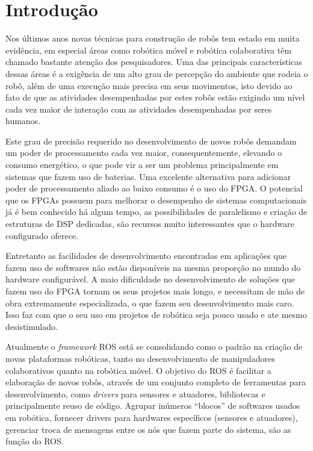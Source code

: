 \chapter{Introdução}\label{cap:intro}


Nos últimos anos novas técnicas para construção de robôs tem estado em muita evidência, em especial áreas como robótica móvel e robótica colaborativa têm chamado bastante atenção dos pesquisadores. Uma das principais características dessas áreas é a exigência de um alto grau de percepção do ambiente que rodeia o robô, além de uma execução mais precisa em seus movimentos, isto devido ao fato de que as atividades desempenhadas por estes robôs estão exigindo um nível cada vez maior de interação com as atividades desempenhadas por seres humanos.

Este grau de precisão requerido no desenvolvimento de novos robôs demandam um poder de processamento cada vez maior, consequentemente, elevando o consumo energético, o que pode vir a ser um problema principalmente em sistemas que fazem uso de baterias. Uma excelente alternativa para adicionar poder de processamento aliado ao baixo consumo é o uso do FPGA\@. O potencial que os FPGAs possuem para melhorar o desempenho de sistemas computacionais já é bem conhecido há algum tempo, as possibilidades de paralelismo e criação de estruturas de DSP dedicadas, são recursos muito interessantes que o hardware configurado oferece. 

Entretanto as facilidades de desenvolvimento encontradas em aplicações que fazem uso de softwares não estão disponíveis na mesma proporção no mundo do hardware configurável. A maio dificuldade no desenvolvimento de soluções que fazem uso do FPGA tornam os seus projetos mais longo, e necessitam de mão de obra extremamente especializada, o que fazem seu desenvolvimento mais caro. Isso faz com que o seu uso em projetos de robótica seja pouco usado e ate mesmo desistimulado. 

Atualmente o \textit{framework} ROS está se consolidando como o padrão na criação de novas plataformas robóticas, tanto no desenvolvimento de manipuladores colaborativos quanto na robótica móvel. O objetivo do ROS é facilitar a elaboração de novos robôs, através de um conjunto completo de ferramentas para desenvolvimento, como \textit{drivers} para sensores e atuadores, bibliotecas e principalmente reuso de código. Agrupar inúmeros ``blocos'' de softwares usados em robótica, fornecer drivers para hardwares específicos (sensores e atuadores), gerenciar troca de mensagens entre os nós que fazem parte do sistema, são as função do ROS\@. 

